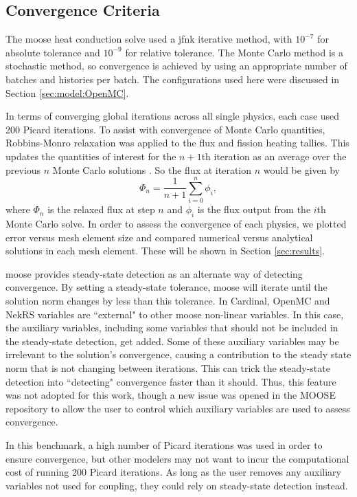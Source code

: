 \documentclass[letterpaper]{mc2023}
\begin{document}
\subsection{Convergence Criteria}
The \gls{moose} heat conduction solve used a \gls{jfnk} iterative method, with $10^{-7}$ for absolute tolerance and $10^{-9}$ for
relative tolerance. The Monte Carlo method is a stochastic method, so convergence is achieved by using an appropriate number of
batches and histories per batch. The configurations used here were discussed in Section \ref{sec:model:OpenMC}.

In terms of converging global iterations across all single physics, each case used 200 Picard iterations. To assist with
convergence of Monte Carlo quantities, Robbins-Monro relaxation was applied to the flux and fission heating tallies. This updates the
quantities of interest for the $n+1$th iteration as an average over the previous $n$ Monte Carlo solutions \cite{dufek}.
So the flux at iteration $n$ would be given by
\begin{equation}\label{eq:Robbins-Monro}
    \Phi_{n} = \frac{1}{n+1} \sum_{i=0}^{n} \phi_{i},
\end{equation}
where $\Phi_{n}$ is the relaxed flux at step $n$ and $\phi_{i}$ is the flux output from the $i$th Monte Carlo solve. In order to assess
the convergence of each physics, we plotted error versus mesh element size and compared numerical versus analytical solutions in each
mesh element. These will be shown in Section \ref{sec:results}.

\gls{moose} provides steady-state detection as an alternate way of detecting convergence. By setting a steady-state tolerance, \gls{moose}
will iterate until the solution norm changes by less than this tolerance. In Cardinal, OpenMC and NekRS variables are ``external" to other
\gls{moose} non-linear variables. In this case, the auxiliary variables, including some variables that should not be included in the
steady-state detection, get added. Some of these auxiliary variables may be irrelevant to the solution's convergence, causing a contribution
to the steady state norm that is not changing between iterations. This can trick the steady-state detection into ``detecting" convergence
faster than it should. Thus, this feature was not adopted for this work, though a new issue was opened in the MOOSE repository to allow the
user to control which auxiliary variables are used to assess convergence.

In this benchmark, a high number of Picard iterations was used in order to ensure convergence, but other modelers may not want to incur
the computational cost of running 200 Picard iterations. As long as the user removes any auxiliary variables not used for coupling, they
could rely on steady-state detection instead.
\end{document}
